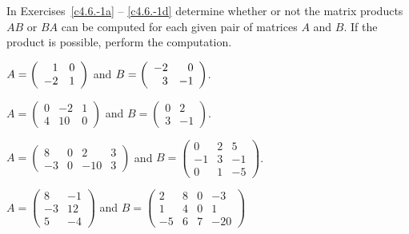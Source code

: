 \documentclass{ximera}
\begin{document}
\noindent In Exercises~\ref{c4.6.-1a} -- \ref{c4.6.-1d} determine whether or 
not the matrix products $AB$ or $BA$ can be computed for each given pair of 
matrices $A$ and $B$.  If the product is possible, perform the computation.
\begin{exercise}  \label{c4.6.-1a}
$A=\left(\begin{array}{rr} 1 & 0\\ -2 &1\end{array}\right)$ and $B=\left(\begin{array}{rr} -2 & 0\\ 3 &-1\end{array}\right)$.
\end{exercise}
\begin{exercise}  \label{c4.6.-1b}
$A=\left(\begin{array}{rrr} 0 & -2 & 1\\ 4 & 10 & 0 \end{array}\right)$
and $B=\left(\begin{array}{rr} 0 & 2 \\ 3 & -1 \end{array}\right)$.
\end{exercise}
\begin{exercise}  \label{c4.6.-1c}
$A=\left(\begin{array}{rrrr} 8 & 0 & 2 & 3\\ -3 & 0 & -10 &
3\end{array}\right)$
and $B=\left(\begin{array}{rrr} 0 & 2 & 5\\ -1 & 3 & -1 \\ 0 & 1 &
-5\end{array}\right)$.
\end{exercise}
\begin{exercise}  \label{c4.6.-1d}
$A=\left(\begin{array}{rr} 8 & -1 \\ -3 & 12 \\ 5 & -4\end{array}\right)$
and $B=\left(\begin{array}{rrrr} 2 & 8 & 0 & -3\\ 1 & 4 & 0 & 1\\
-5 & 6 & 7 & -20\end{array}\right)$
\end{exercise}
\end{document}
